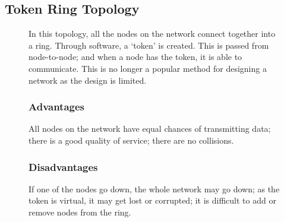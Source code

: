 \subsection*{Token Ring Topology}
\begin{figure}[H]
    \begin{minipage}[H]{0.6\textwidth}
        In this topology, all the nodes on the network connect together into a ring. Through software, a `token' is created. This is passed from node-to-node; and when a node has the token, it is able to communicate. This is no longer a popular method for designing a network as the design is limited.
        \subsubsection*{Advantages}
        All nodes on the network have equal chances of transmitting data; there is a good quality of service; there are no collisions.
        \subsubsection*{Disadvantages}
        If one of the nodes go down, the whole network may go down; as the token is virtual, it may get lost or corrupted; it is difficult to add or remove nodes from the ring.
    \end{minipage}\hfill
    \begin{minipage}[H]{0.35\textwidth}
        \centering
    \end{minipage}\hfill
\end{figure}
